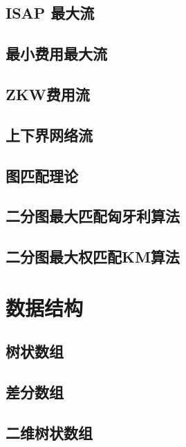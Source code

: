 \section{	ISAP 最大流}
\raggedbottom
\hrulefill
\section{最小费用最大流}
\raggedbottom
\hrulefill
\section{ZKW费用流}
\raggedbottom
\hrulefill
\section{上下界网络流}
\raggedbottom
\hrulefill
\section{图匹配理论}
\raggedbottom
\hrulefill
\section{二分图最大匹配匈牙利算法}
\raggedbottom
\hrulefill
\section{二分图最大权匹配KM算法}
\raggedbottom
\hrulefill

\chapter{数据结构}
\section{树状数组}
\raggedbottom
\hrulefill
\section{差分数组}
\raggedbottom
\hrulefill
\section{二维树状数组}
\raggedbottom
\hrulefill
